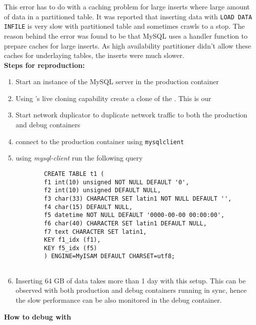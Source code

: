 This error has to do with a caching problem for large inserts where large amount of data in a partitioned table.
It was reported that inserting data with \texttt{LOAD DATA INFILE} is very slow with partitioned table and sometimes crawls to a stop.
The reason behind the error was found to be that MySQL uses a handler function to prepare caches for large inserts.
As high availability partitioner didn't allow these caches for underlaying tables, the inserts were much slower.\\

\noindent \textbf{Steps for reproduction:} \\

\begin{adjustwidth}{0.5cm}{}
	\begin{enumerate}
		\item Start an instance of the MySQL server in the production container
		\item Using \parikshan's live cloning capability create a clone of the \productioncontainer. This is our \debugcontainer
		\item Start network duplicator to duplicate network traffic to both the production and debug containers
		\item connect to the production container using \texttt{mysqlclient}
		\item using \emph{mysql-client} run the following query
		
		\begin{lstlisting}
		CREATE TABLE t1 (
		f1 int(10) unsigned NOT NULL DEFAULT '0',
		f2 int(10) unsigned DEFAULT NULL,
		f3 char(33) CHARACTER SET latin1 NOT NULL DEFAULT '',
		f4 char(15) DEFAULT NULL,
		f5 datetime NOT NULL DEFAULT '0000-00-00 00:00:00',
		f6 char(40) CHARACTER SET latin1 DEFAULT NULL,
		f7 text CHARACTER SET latin1,
		KEY f1_idx (f1),
		KEY f5_idx (f5)
		) ENGINE=MyISAM DEFAULT CHARSET=utf8;
		
		\end{lstlisting}
		
		\item Inserting 64 GB of data takes more than 1 day with this setup. This can be observed with both production and debug containers running in sync, hence the slow performance can be also monitored in the debug container.
		
	\end{enumerate}
\end{adjustwidth}	

\noindent \textbf{How to debug with \parikshan}

